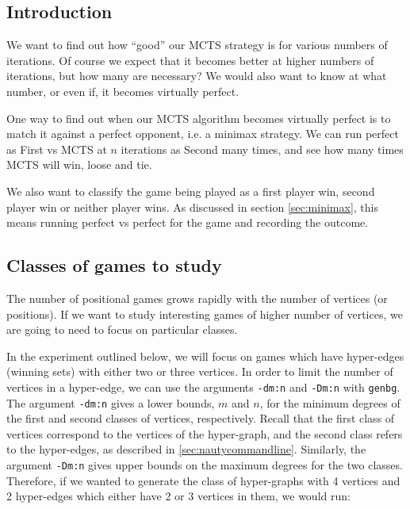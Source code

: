 \subsection{Introduction}


We want to find out how ``good'' our MCTS strategy is for various numbers of iterations.
Of course we expect that it becomes better at higher numbers of iterations, but how many are necessary?
We would also want to know at what number, or even if, it becomes virtually perfect.


One way to find out when our MCTS algorithm becomes virtually perfect is to match it against a perfect opponent, i.e. a minimax strategy.
We can run perfect as First vs MCTS at $n$ iterations as Second many times, and see how many times MCTS will win, loose and tie.

We also want to classify the game being played as a first player win, second player win or neither player wins.
As discussed in section \ref{sec:minimax}, this means running perfect vs perfect for the game and recording the outcome.


\subsection{Classes of games to study}

The number of positional games grows rapidly with the number of vertices (or positions).
If we want to study interesting games of higher number of vertices, we are going to need to focus on particular classes.

In the experiment outlined below, we will focus on games which have hyper-edges (winning sets) with either two or three vertices.
In order to limit the number of vertices in a hyper-edge, we can use the arguments \texttt{-dm:n} and \texttt{-Dm:n} with \texttt{genbg}.
The argument \texttt{-dm:n} gives a lower bounds, $m$ and $n$, for the minimum degrees of the first and second classes of vertices, respectively.
Recall that the first class of vertices correspond to the vertices of the hyper-graph, and the second class refers to the hyper-edges, as described in \ref{sec:nautycommandline}.
Similarly, the argument \texttt{-Dm:n} gives upper bounds on the maximum degrees for the two classes.
Therefore, if we wanted to generate the class of hyper-graphs with 4 vertices and 2 hyper-edges which either have 2 or 3 vertices in them, we would run:


